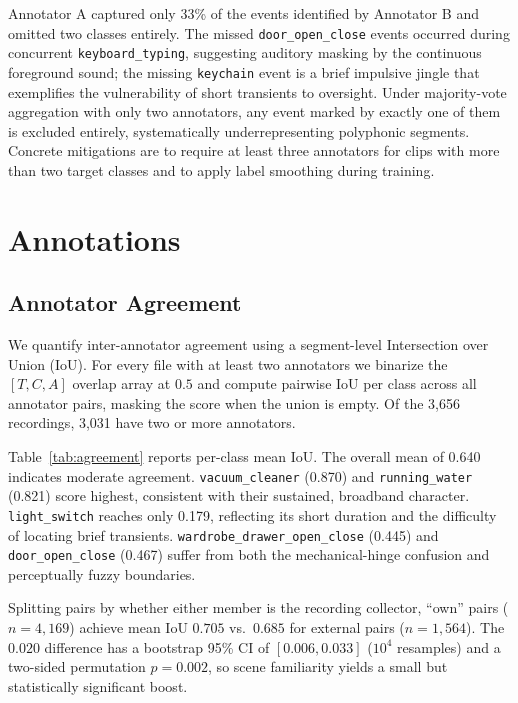 \documentclass{article}
\begin{document}
Annotator A captured only 33\% of the events identified by Annotator B and omitted two classes entirely. The missed \texttt{door\_open\_close} events occurred during concurrent \texttt{keyboard\_typing}, suggesting auditory masking by the continuous foreground sound; the missing \texttt{keychain} event is a brief impulsive jingle that exemplifies the vulnerability of short transients to oversight. Under majority-vote aggregation with only two annotators, any event marked by exactly one of them is excluded entirely, systematically underrepresenting polyphonic segments. Concrete mitigations are to require at least three annotators for clips with more than two target classes and to apply label smoothing during training.

\section{Annotations}

\subsection{Annotator Agreement}

We quantify inter-annotator agreement using a segment-level Intersection over Union (IoU). For every file with at least two annotators we binarize the $[T,C,A]$ overlap array at $0.5$ and compute pairwise IoU per class across all annotator pairs, masking the score when the union is empty. Of the 3{,}656 recordings, 3{,}031 have two or more annotators.

Table~\ref{tab:agreement} reports per-class mean IoU. The overall mean of 0.640 indicates moderate agreement. \texttt{vacuum\_cleaner} (0.870) and \texttt{running\_water} (0.821) score highest, consistent with their sustained, broadband character. \texttt{light\_switch} reaches only 0.179, reflecting its short duration and the difficulty of locating brief transients. \texttt{wardrobe\_drawer\_open\_close} (0.445) and \texttt{door\_open\_close} (0.467) suffer from both the mechanical-hinge confusion and perceptually fuzzy boundaries.

Splitting pairs by whether either member is the recording collector, ``own'' pairs ($n=4{,}169$) achieve mean IoU $0.705$ vs.\ $0.685$ for external pairs ($n=1{,}564$). The $0.020$ difference has a bootstrap 95\% CI of $[0.006, 0.033]$ ($10^4$ resamples) and a two-sided permutation $p = 0.002$, so scene familiarity yields a small but statistically significant boost.
\end{document}
